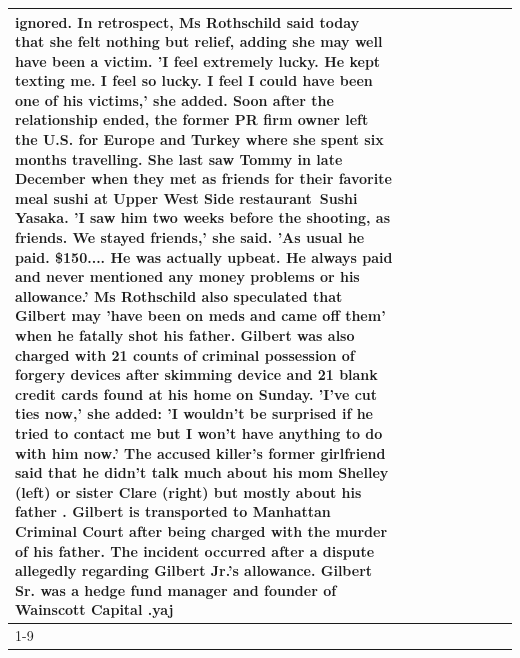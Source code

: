 \begin{table}[H]
\begin{tabular}{lllrlllll}
ignored. In retrospect, Ms Rothschild said today that she felt nothing but relief, adding she may well have been a victim. 'I feel extremely lucky. He kept texting me. I feel so lucky. I feel I could have been one of his victims,' she added. Soon after the relationship ended, the former PR firm owner left the U.S. for Europe and Turkey where she spent six months  travelling. She last saw Tommy in late December when they met as friends for their favorite meal sushi at Upper West Side restaurant Sushi Yasaka. 'I saw him two weeks before the shooting, as friends. We stayed friends,' she said. 'As usual he paid. \$150.... He was actually upbeat. He always paid and never mentioned any money problems or his allowance.' Ms Rothschild also speculated that Gilbert may 'have been on meds and came off them' when he fatally shot his father. Gilbert was also charged with 21 counts of criminal possession of forgery devices after skimming device and 21 blank credit cards found at his home on Sunday. 'I've cut ties now,' she added: 'I wouldn’t be surprised if he tried to contact me but I won’t have anything to do with him now.' The accused killer's former girlfriend said that he didn't talk much about his mom Shelley (left) or sister Clare (right) but mostly about his father . Gilbert is transported to Manhattan Criminal Court  after being charged with the murder of his father. The incident occurred after a dispute allegedly regarding Gilbert Jr.'s allowance. Gilbert Sr. was a hedge fund manager and founder of Wainscott Capital .yaj \\
\cline{1-9}

\end{tabular}
\end{table}
